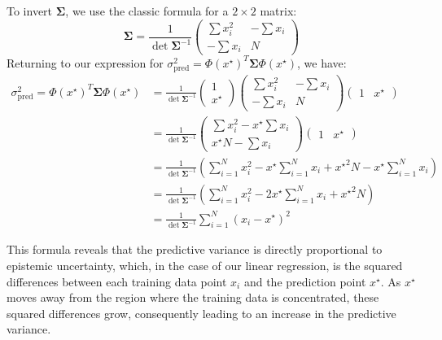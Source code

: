 To invert $\boldsymbol{\Sigma}$, we use the classic formula for a $2 \times 2$ matrix:
\[
    \boldsymbol{\Sigma} = \frac{1}{\det \boldsymbol{\Sigma}^{-1}} \begin{pmatrix}
         \sum x_i^2 & -  \sum x_i \\
        -  \sum x_i & N
    \end{pmatrix}
\]
Returning to our expression for $ \sigma^2_{\text{pred}} = \Phi (x^\star ) ^T \boldsymbol{\Sigma} \Phi (x^\star )$, we have:
\begin{align*}
    \sigma^2_{\text{pred}} = \Phi (x^\star ) ^T \boldsymbol{\Sigma} \Phi (x^\star ) &= \frac{1}{\det \boldsymbol{\Sigma}^{-1}} \begin{pmatrix}
        1 \\
        x^\star 
    \end{pmatrix} \begin{pmatrix}
         \sum x_i^2 & -  \sum x_i \\
        -  \sum x_i & N
    \end{pmatrix}\begin{pmatrix}
        1 & x^\star 
    \end{pmatrix} \\
    &= \frac{1}{\det \boldsymbol{\Sigma}^{-1}} \begin{pmatrix} \sum x_i^2 - x^\star  \sum x_i \\ x^\star N -  \sum x_i\end{pmatrix} \begin{pmatrix}1 & x^\star \end{pmatrix} \\
    &= \frac{1}{\det \boldsymbol{\Sigma}^{-1}}\left( \sum_{i=1}^{N} x_i^2 - x^\star  \sum_{i=1}^{N} x_i + {x^\star }^2 N - x^\star  \sum_{i=1}^{N} x_i\right) \\
    &= \frac{1}{\det \boldsymbol{\Sigma}^{-1}}\left( \sum_{i=1}^{N} x_i^2 - 2 x^\star  \sum_{i=1}^{N} x_i + {x^\star }^2 N\right) \\
    &= \frac{1}{\det \boldsymbol{\Sigma}^{-1}} \sum_{i=1}^{N} \left(x_i - x^\star \right)^2
\end{align*}

This formula reveals that the predictive variance is directly proportional to epistemic uncertainty, which, in the case of our linear regression, is the squared differences between each training data point $x_i$ and the prediction point $x^\star$. As $x^\star$ moves away from the region where the training data is concentrated, these squared differences grow, consequently leading to an increase in the predictive variance.

